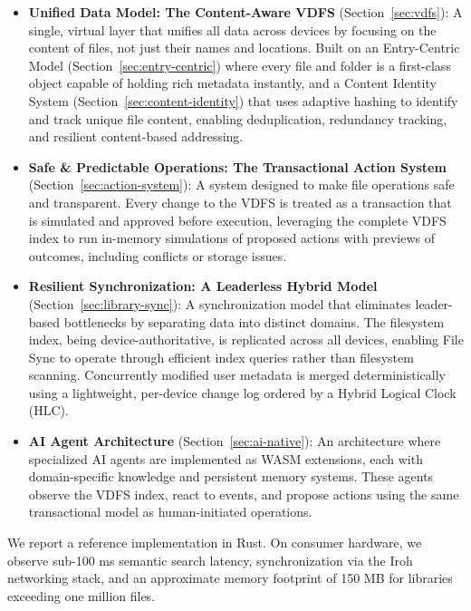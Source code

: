\documentclass[sigconf]{acmart}
\begin{document}
\begin{itemize}[noitemsep, topsep=0pt]
 \item \textbf{Unified Data Model: The Content-Aware VDFS} (Section~\ref{sec:vdfs}): A single, virtual layer that unifies all data across devices by focusing on the content of files, not just their names and locations. Built on an Entry-Centric Model (Section~\ref{sec:entry-centric}) where every file and folder is a first-class object capable of holding rich metadata instantly, and a Content Identity System (Section~\ref{sec:content-identity}) that uses adaptive hashing to identify and track unique file content, enabling deduplication, redundancy tracking, and resilient content-based addressing.

 \item \textbf{Safe \& Predictable Operations: The Transactional Action System} (Section~\ref{sec:action-system}): A system designed to make file operations safe and transparent. Every change to the VDFS is treated as a transaction that is simulated and approved before execution, leveraging the complete VDFS index to run in-memory simulations of proposed actions with previews of outcomes, including conflicts or storage issues.

 \item \textbf{Resilient Synchronization: A Leaderless Hybrid Model} (Section~\ref{sec:library-sync}): A synchronization model that eliminates leader-based bottlenecks by separating data into distinct domains. The filesystem index, being device-authoritative, is replicated across all devices, enabling File Sync to operate through efficient index queries rather than filesystem scanning. Concurrently modified user metadata is merged deterministically using a lightweight, per-device change log ordered by a Hybrid Logical Clock (HLC).

 \item \textbf{AI Agent Architecture} (Section~\ref{sec:ai-native}): An architecture where specialized AI agents are implemented as WASM extensions, each with domain-specific knowledge and persistent memory systems. These agents observe the VDFS index, react to events, and propose actions using the same transactional model as human-initiated operations.
\end{itemize}

We report a reference implementation in Rust. On consumer hardware, we observe sub-100 ms semantic search latency, synchronization via the Iroh networking stack, and an approximate memory footprint of 150 MB for libraries exceeding one million files.
\end{document}
